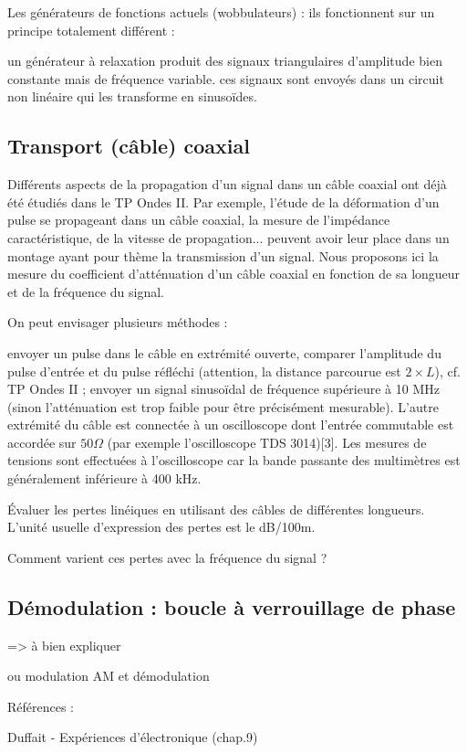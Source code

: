 \documentclass{article}%
\begin{document}
Les générateurs de fonctions actuels (wobbulateurs) : ils fonctionnent sur un principe totalement différent :

    un générateur à relaxation produit des signaux triangulaires d'amplitude bien constante mais de fréquence variable.
    ces signaux sont envoyés dans un circuit non linéaire qui les transforme en sinusoïdes.

\subsection{Transport (câble) coaxial}

Différents aspects de la propagation d'un signal dans un câble coaxial ont déjà été étudiés dans le TP Ondes II. Par exemple, l'étude de la déformation d'un pulse se propageant dans un câble coaxial, la mesure de l'impédance caractéristique, de la vitesse de propagation... peuvent avoir leur place dans un montage ayant pour thème la transmission d'un signal. Nous proposons ici la mesure du coefficient d'atténuation d'un câble coaxial en fonction de sa longueur et de la fréquence du signal.

On peut envisager plusieurs méthodes :

    envoyer un pulse dans le câble en extrémité ouverte, comparer l'amplitude du pulse d'entrée et du pulse réfléchi (attention, la distance parcourue est $2 \times L$), cf. TP Ondes II ;
    envoyer un signal sinusoïdal de fréquence supérieure à 10 MHz (sinon l'atténuation est trop faible pour être précisément mesurable). L'autre extrémité du câble est connectée à un oscilloscope dont l'entrée commutable est accordée sur $50 \Omega$ (par exemple l'oscilloscope TDS 3014)[3]. Les mesures de tensions sont effectuées à l'oscilloscope car la bande passante des multimètres est généralement inférieure à 400 kHz.

Évaluer les pertes linéiques en utilisant des câbles de différentes longueurs. L'unité usuelle d'expression des pertes est le dB/100m.

Comment varient ces pertes avec la fréquence du signal ? 

\subsection{Démodulation : boucle à verrouillage de phase}
=> à bien expliquer

ou modulation AM et démodulation

Références :

Duffait - Expériences d'électronique (chap.9)
\end{document}
